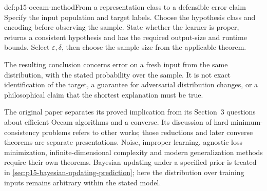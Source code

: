 \begin{hbmethod}{def:p15-occam-method}{From a representation class to a defensible error claim}
Specify the input population and target labels. Choose the hypothesis
class and encoding before observing the sample. State whether the
learner is proper, returns a consistent hypothesis and has the required
output-size and runtime bounds. Select \(\varepsilon,\delta\), then
choose the sample size from the applicable theorem.

The resulting conclusion concerns error on a fresh input from the
same distribution, with the stated probability over the sample.
It is not exact identification of the target, a guarantee for
adversarial distribution changes, or a philosophical claim that
the shortest explanation must be true.
\end{hbmethod}

The original paper separates its proved implication from its
Section~3 questions about efficient Occam algorithms and a converse.
Its discussion of hard minimum-consistency problems refers to
other works; those reductions and later converse theorems are
separate presentations. Noise, improper learning, agnostic loss
minimization, infinite-dimensional complexity and modern generalization
methods require their own theorems. Bayesian updating under a
specified prior is treated in
\cref{sec:p15-bayesian-updating-prediction}; here the distribution
over training inputs remains arbitrary within the stated model.
